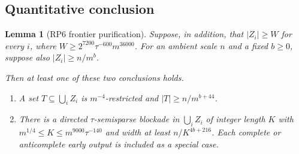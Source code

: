 \documentclass[11pt,a4paper]{article}
\newtheorem{lemma}[theorem]{Lemma}
\theoremstyle{definition}
\theoremstyle{remark}
\numberwithin{equation}{section}
\begin{document}
\subsection{Quantitative conclusion}\label{subsec:rp6-frontier}
\begin{lemma}[RP6 frontier purification]\label{lem:rp6-frontier}
Suppose, in addition, that \(|Z_{i}|\ge\allowbreak W\) for every \(i\), where \(W \ge\allowbreak  2^{7200} \tau^{-600} m^{36000}\). For an ambient scale \(n\) and a fixed \(b\ge\allowbreak 0\), suppose also \(|Z_{i}|\ge\allowbreak n/m^{b}\).

Then at least one of these two conclusions holds.
\begin{enumerate}[label=(\Alph*)]
\item A set \(T\subseteq\bigcup_i Z_{i}\) is \(m^{-4}\)-restricted and \(|T|\ge n/m^{b+44}\).
\item There is a directed \(\tau\)-semisparse blockade in \(\bigcup_i Z_{i}\) of integer length \(K\) with \(m^{1/4} \le K \le m^{9000} \tau^{-140}\) and width at least \(n/K^{4b+216}\). Each complete or anticomplete early output is included as a special case.
\end{enumerate}

\end{lemma}
\end{document}

